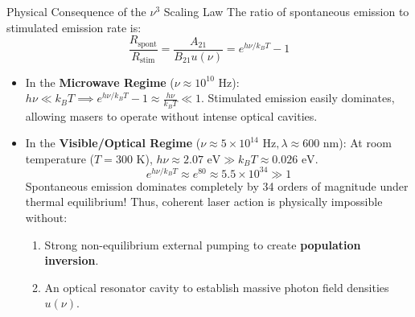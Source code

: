 \begin{conceptbox}{Physical Consequence of the $\nu^3$ Scaling Law}
The ratio of spontaneous emission to stimulated emission rate is:
\begin{equation}
\frac{R_{\text{spont}}}{R_{\text{stim}}} = \frac{A_{21}}{B_{21} u(\nu)} = e^{h\nu/k_B T} - 1
\end{equation}
\begin{itemize}[itemsep=2pt]
    \item In the \textbf{Microwave Regime} ($\nu \approx 10^{10}\text{ Hz}$): $h\nu \ll k_B T \implies e^{h\nu/k_B T} - 1 \approx \frac{h\nu}{k_B T} \ll 1$. Stimulated emission easily dominates, allowing masers to operate without intense optical cavities.
    \item In the \textbf{Visible/Optical Regime} ($\nu \approx 5 \times 10^{14}\text{ Hz}, \lambda \approx 600\text{ nm}$): At room temperature ($T = 300\text{ K}$), $h\nu \approx 2.07\text{ eV} \gg k_B T \approx 0.026\text{ eV}$.
    \[
    e^{h\nu/k_B T} \approx e^{80} \approx 5.5 \times 10^{34} \gg 1
    \]
    Spontaneous emission dominates completely by 34 orders of magnitude under thermal equilibrium! Thus, coherent laser action is physically impossible without:
    \begin{enumerate}
        \item Strong non-equilibrium external pumping to create \textbf{population inversion}.
        \item An optical resonator cavity to establish massive photon field densities $u(\nu)$.
    \end{enumerate}
\end{itemize}
\end{conceptbox}

